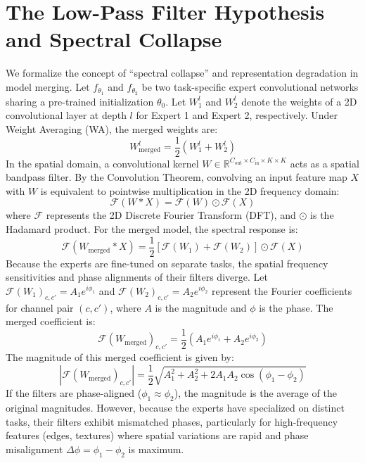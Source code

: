 \documentclass{article}
\theoremstyle{plain}
\theoremstyle{definition}
\theoremstyle{remark}
\begin{document}
\section{The Low-Pass Filter Hypothesis and Spectral Collapse}
\label{sec:hypothesis}
We formalize the concept of ``spectral collapse'' and representation degradation in model merging. Let $f_{\theta_1}$ and $f_{\theta_2}$ be two task-specific expert convolutional networks sharing a pre-trained initialization $\theta_0$. Let $W^l_1$ and $W^l_2$ denote the weights of a 2D convolutional layer at depth $l$ for Expert 1 and Expert 2, respectively. Under Weight Averaging (WA), the merged weights are:
\begin{equation}
    W^l_{\text{merged}} = \frac{1}{2}(W^l_1 + W^l_2)
\end{equation}
In the spatial domain, a convolutional kernel $W \in \mathbb{R}^{C_{\text{out}} \times C_{\text{in}} \times K \times K}$ acts as a spatial bandpass filter. By the Convolution Theorem, convolving an input feature map $X$ with $W$ is equivalent to pointwise multiplication in the 2D frequency domain:
\begin{equation}
    \mathcal{F}(W * X) = \mathcal{F}(W) \odot \mathcal{F}(X)
\end{equation}
where $\mathcal{F}$ represents the 2D Discrete Fourier Transform (DFT), and $\odot$ is the Hadamard product. For the merged model, the spectral response is:
\begin{equation}
    \mathcal{F}(W_{\text{merged}} * X) = \frac{1}{2} \left[ \mathcal{F}(W_1) + \mathcal{F}(W_2) \right] \odot \mathcal{F}(X)
\end{equation}
Because the experts are fine-tuned on separate tasks, the spatial frequency sensitivities and phase alignments of their filters diverge. Let $\mathcal{F}(W_1)_{c,c'} = A_1 e^{i\phi_1}$ and $\mathcal{F}(W_2)_{c,c'} = A_2 e^{i\phi_2}$ represent the Fourier coefficients for channel pair $(c, c')$, where $A$ is the magnitude and $\phi$ is the phase. The merged coefficient is:
\begin{equation}
    \mathcal{F}(W_{\text{merged}})_{c,c'} = \frac{1}{2} \left( A_1 e^{i\phi_1} + A_2 e^{i\phi_2} \right)
\end{equation}
The magnitude of this merged coefficient is given by:
\begin{equation}
    |\mathcal{F}(W_{\text{merged}})_{c,c'}| = \frac{1}{2} \sqrt{A_1^2 + A_2^2 + 2A_1 A_2 \cos(\phi_1 - \phi_2)}
\end{equation}
If the filters are phase-aligned ($\phi_1 \approx \phi_2$), the magnitude is the average of the original magnitudes. However, because the experts have specialized on distinct tasks, their filters exhibit mismatched phases, particularly for high-frequency features (edges, textures) where spatial variations are rapid and phase misalignment $\Delta\phi = \phi_1 - \phi_2$ is maximum. 
\end{document}
